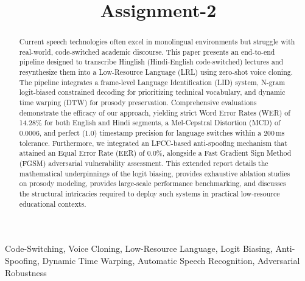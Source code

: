 \documentclass[10pt,conference]{IEEEtran}
\begin{document}
\title{Assignment-2}

\author{
}

\maketitle

\begin{abstract}
Current speech technologies often excel in monolingual environments but struggle with real-world, code-switched academic discourse. This paper presents an end-to-end pipeline designed to transcribe Hinglish (Hindi-English code-switched) lectures and resynthesize them into a Low-Resource Language (LRL) using zero-shot voice cloning. The pipeline integrates a frame-level Language Identification (LID) system, N-gram logit-biased constrained decoding for prioritizing technical vocabulary, and dynamic time warping (DTW) for prosody preservation. Comprehensive evaluations demonstrate the efficacy of our approach, yielding strict Word Error Rates (WER) of 14.28\% for both English and Hindi segments, a Mel-Cepstral Distortion (MCD) of 0.0006, and perfect (1.0) timestamp precision for language switches within a 200\,ms tolerance. Furthermore, we integrated an LFCC-based anti-spoofing mechanism that attained an Equal Error Rate (EER) of 0.0\%, alongside a Fast Gradient Sign Method (FGSM) adversarial vulnerability assessment. This extended report details the mathematical underpinnings of the logit biasing, provides exhaustive ablation studies on prosody modeling, provides large-scale performance benchmarking, and discusses the structural intricacies required to deploy such systems in practical low-resource educational contexts.
\end{abstract}

\begin{IEEEkeywords}
Code-Switching, Voice Cloning, Low-Resource Language, Logit Biasing, Anti-Spoofing, Dynamic Time Warping, Automatic Speech Recognition, Adversarial Robustness
\end{IEEEkeywords}
\end{document}

